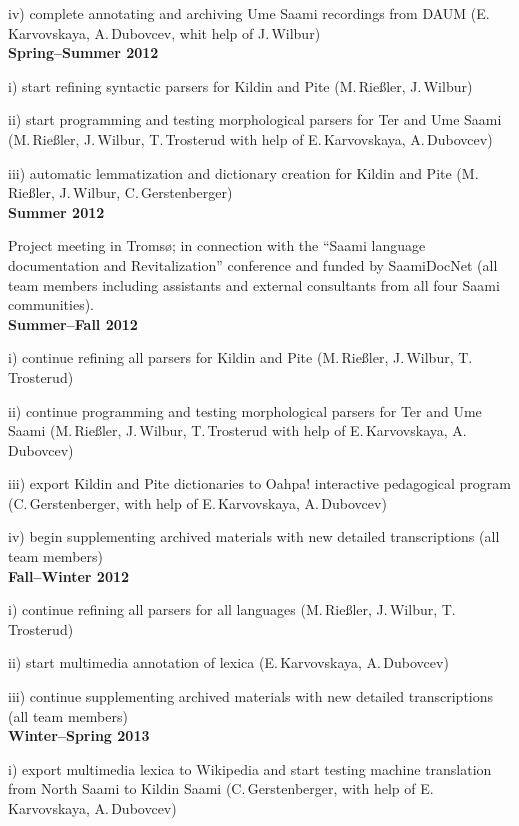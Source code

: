 \documentclass[a4paper,12pt]{article}
\begin{document}
{{iv) complete annotating and archiving Ume Saami recordings from DAUM (E.\,Karvovskaya, A.\,Dubovcev, whit help of J.\,Wilbur)\\

\noindent \textbf{Spring–Summer 2012}

i) start refining syntactic parsers for Kildin and Pite (M.\,Rießler, J.\,Wilbur)

ii) start programming and testing morphological parsers for Ter and Ume Saami (M.\,Rießler, J.\,Wilbur, T.\,Trosterud with help of E.\,Karvovskaya, A.\,Dubovcev)

iii) automatic lemmatization and dictionary creation for Kildin and Pite (M.\,Rießler, J.\,Wilbur, C.\,Gerstenberger)\\

\noindent \textbf{Summer 2012} 

Project meeting in Tromsø; in connection with the “Saami language documentation and Revitalization” conference and funded by SaamiDocNet (all team members including assistants and external consultants from all four Saami communities).\\

\noindent \textbf{Summer–Fall 2012}

i) continue refining all parsers for Kildin and Pite (M.\,Rießler, J.\,Wilbur, T.\,Trosterud)

ii) continue programming and testing morphological parsers for Ter and Ume Saami (M.\,Rießler, J.\,Wilbur, T.\,Trosterud with help of E.\,Karvovskaya, A.\,Dubovcev)

iii) export Kildin and Pite dictionaries to Oahpa! interactive pedagogical program (C.\,Gerstenberger, with help of E.\,Karvovskaya, A.\,Dubovcev)

iv) begin supplementing archived materials with new detailed transcriptions (all team members)\\

\noindent \textbf{Fall–Winter 2012}

i) continue refining all parsers for all languages (M.\,Rießler, J.\,Wilbur, T.\,Trosterud)

ii) start multimedia annotation of lexica (E.\,Karvovskaya, A.\,Dubovcev)

iii) continue supplementing archived materials with new detailed transcriptions (all team members)\\

\noindent \textbf{Winter–Spring 2013}

i) export multimedia lexica to Wikipedia and start testing machine translation from North Saami to Kildin Saami (C.\,Gerstenberger, with help of E.\,Karvovskaya, A.\,Dubovcev)

}}
\end{document}
